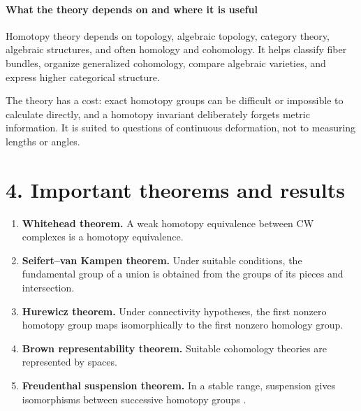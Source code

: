 \paragraph{What the theory depends on and where it is useful}
Homotopy theory depends on topology, algebraic topology, category theory, algebraic structures, and often homology and cohomology. It helps classify fiber bundles, organize generalized cohomology, compare algebraic varieties, and express higher categorical structure.

The theory has a cost: exact homotopy groups can be difficult or impossible to calculate directly, and a homotopy invariant deliberately forgets metric information. It is suited to questions of continuous deformation, not to measuring lengths or angles.

\section*{4. Important theorems and results}
\begin{enumerate}[leftmargin=*,itemsep=0.35em]
\item \textbf{Whitehead theorem.} A weak homotopy equivalence between CW complexes is a homotopy equivalence.

\item \textbf{Seifert--van Kampen theorem.} Under suitable conditions, the fundamental group of a union is obtained from the groups of its pieces and intersection.

\item \textbf{Hurewicz theorem.} Under connectivity hypotheses, the first nonzero homotopy group maps isomorphically to the first nonzero homology group.

\item \textbf{Brown representability theorem.} Suitable cohomology theories are represented by spaces.

\item \textbf{Freudenthal suspension theorem.} In a stable range, suspension gives isomorphisms between successive homotopy groups \cite{homotopy_theory_ref4}.
\end{enumerate}

